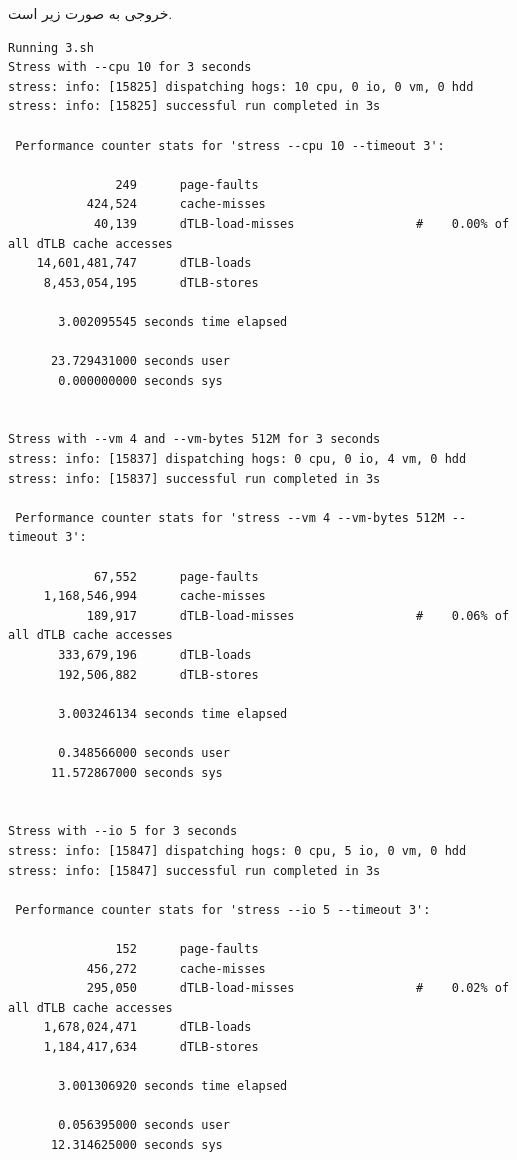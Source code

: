 \documentclass{article}
\begin{document}
خروجی به صورت زیر است. 
\begin{latin}
\begin{lstlisting}
Running 3.sh
Stress with --cpu 10 for 3 seconds
stress: info: [15825] dispatching hogs: 10 cpu, 0 io, 0 vm, 0 hdd
stress: info: [15825] successful run completed in 3s

 Performance counter stats for 'stress --cpu 10 --timeout 3':

               249      page-faults                                                           
           424,524      cache-misses                                                          
            40,139      dTLB-load-misses                 #    0.00% of all dTLB cache accesses
    14,601,481,747      dTLB-loads                                                            
     8,453,054,195      dTLB-stores                                                           

       3.002095545 seconds time elapsed

      23.729431000 seconds user
       0.000000000 seconds sys


Stress with --vm 4 and --vm-bytes 512M for 3 seconds
stress: info: [15837] dispatching hogs: 0 cpu, 0 io, 4 vm, 0 hdd
stress: info: [15837] successful run completed in 3s

 Performance counter stats for 'stress --vm 4 --vm-bytes 512M --timeout 3':

            67,552      page-faults                                                           
     1,168,546,994      cache-misses                                                          
           189,917      dTLB-load-misses                 #    0.06% of all dTLB cache accesses
       333,679,196      dTLB-loads                                                            
       192,506,882      dTLB-stores                                                           

       3.003246134 seconds time elapsed

       0.348566000 seconds user
      11.572867000 seconds sys


Stress with --io 5 for 3 seconds
stress: info: [15847] dispatching hogs: 0 cpu, 5 io, 0 vm, 0 hdd
stress: info: [15847] successful run completed in 3s

 Performance counter stats for 'stress --io 5 --timeout 3':

               152      page-faults                                                           
           456,272      cache-misses                                                          
           295,050      dTLB-load-misses                 #    0.02% of all dTLB cache accesses
     1,678,024,471      dTLB-loads                                                            
     1,184,417,634      dTLB-stores                                                           

       3.001306920 seconds time elapsed

       0.056395000 seconds user
      12.314625000 seconds sys
\end{lstlisting}
\end{latin}

\subsection{}

\subsection{}
\end{document}
